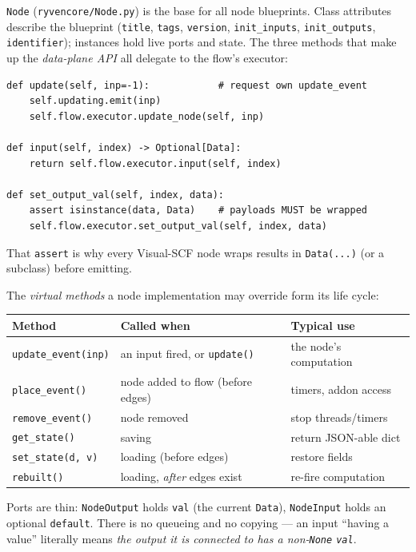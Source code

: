 \documentclass[10pt,a4paper]{article}
\newcommand{\code}[1]{\texttt{\small #1}}
\begin{document}
\code{Node} (\code{ryvencore/Node.py}) is the base for all node blueprints.
Class attributes describe the blueprint (\code{title}, \code{tags}, \code{version},
\code{init\_inputs}, \code{init\_outputs}, \code{identifier});
instances hold live ports and state. The three methods that make up the
\emph{data-plane API} all delegate to the flow's executor:

\begin{lstlisting}
def update(self, inp=-1):            # request own update_event
    self.updating.emit(inp)
    self.flow.executor.update_node(self, inp)

def input(self, index) -> Optional[Data]:
    return self.flow.executor.input(self, index)

def set_output_val(self, index, data):
    assert isinstance(data, Data)    # payloads MUST be wrapped
    self.flow.executor.set_output_val(self, index, data)
\end{lstlisting}

That \code{assert} is why every Visual-SCF node wraps results in \code{Data(...)}
(or a subclass) before emitting.

The \emph{virtual methods} a node implementation may override form its life cycle:

\begin{center}
\small
\begin{tabular}{@{}lll@{}}
\toprule
\textbf{Method} & \textbf{Called when} & \textbf{Typical use}\\
\midrule
\code{update\_event(inp)} & an input fired, or \code{update()} & the node's computation\\
\code{place\_event()}     & node added to flow (before edges)  & timers, addon access\\
\code{remove\_event()}    & node removed                       & stop threads/timers\\
\code{get\_state()}       & saving                             & return JSON-able dict\\
\code{set\_state(d, v)}   & loading (before edges)             & restore fields\\
\code{rebuilt()}          & loading, \emph{after} edges exist  & re-fire computation\\
\bottomrule
\end{tabular}
\end{center}

Ports are thin: \code{NodeOutput} holds \code{val} (the current \code{Data}),
\code{NodeInput} holds an optional \code{default}. There is no queueing and no
copying --- an input ``having a value'' literally means \emph{the output it is connected
to has a non-\code{None} \code{val}}.
\end{document}
